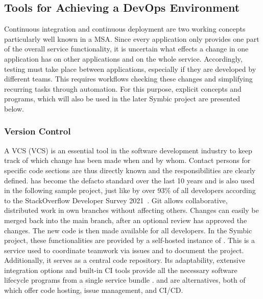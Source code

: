     \subsection{Tools for Achieving a DevOps Environment}\label{ssec::getting_devops}
    Continuous integration and continuous deployment are two working concepts particularly well known in a \ac{MSA}. Since every application only provides one part of the overall service functionality, it is uncertain what effects a change in one application has on other applications and on the whole service. Accordingly, testing must take place between applications, especially if they are developed by different teams. This requires workflows checking these changes and simplifying recurring tasks through automation. For this purpose, explicit concepts and programs, which will also be used in the later Symbic project are presented below.

        \subsubsection{Version Control}
        A \acl{VCS} (\ac{VCS}) is an essential tool in the software development industry to keep track of which change has been made when and by whom. Contact persons for specific code sections are thus directly known and the responsibilities are clearly defined.  has become the defacto standard over the last 10 years and is also used in the following sample project, just like by over 93\% of all developers according to the StackOverflow Developer Survey 2021~\cite{stackoverflow2018}. Git allows collaborative, distributed work in own branches without affecting others. Changes can easily be merged back into the main branch, after an optional review has approved the changes. The new code is then made available for all developers. In the Symbic project, these functionalities are provided by a self-hosted instance of . This is a service used to coordinate teamwork via issues and to document the project. Additionally, it serves as a central code repository. Its adaptability, extensive integration options and built-in \acs{CI} tools provide all the necessary software lifecycle programs from a single service bundle \cite{gitlabdocs}.  and  are alternatives, both of which offer code hosting, issue management, and \ac{CI}/\ac{CD}.

